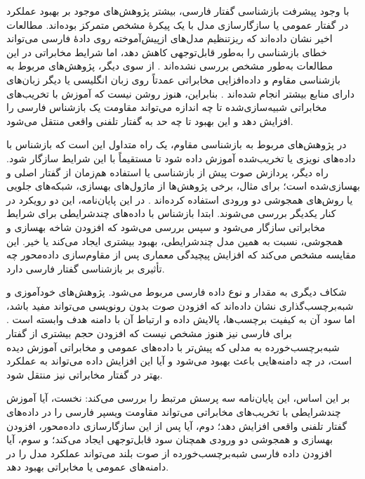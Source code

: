 با وجود پیشرفت بازشناسی گفتار فارسی، بیشتر پژوهش‌های موجود بر بهبود عملکرد در گفتار عمومی یا سازگارسازی مدل با یک پیکرهٔ مشخص متمرکز بوده‌اند. مطالعات اخیر نشان داده‌اند که ریزتنظیم مدل‌های ازپیش‌آموخته روی دادهٔ فارسی می‌تواند خطای بازشناسی را به‌طور قابل‌توجهی کاهش دهد، اما شرایط مخابراتی در این مطالعات به‌طور مشخص بررسی نشده‌اند . از سوی دیگر، پژوهش‌های مربوط به بازشناسی مقاوم و داده‌افزایی مخابراتی عمدتاً روی زبان انگلیسی یا دیگر زبان‌های دارای منابع بیشتر انجام شده‌اند . بنابراین، هنوز روشن نیست که آموزش با تخریب‌های مخابراتی شبیه‌سازی‌شده تا چه اندازه می‌تواند مقاومت یک بازشناس فارسی را افزایش دهد و این بهبود تا چه حد به گفتار تلفنی واقعی منتقل می‌شود.

در پژوهش‌های مربوط به بازشناسی مقاوم، یک راه متداول این است که بازشناس با داده‌های نویزی یا تخریب‌شده آموزش داده شود تا مستقیماً با این شرایط سازگار شود. راه دیگر، پردازش صوت پیش از بازشناسی یا استفاده هم‌زمان از گفتار اصلی و بهسازی‌شده است؛ برای مثال، برخی پژوهش‌ها از ماژول‌های بهسازی، شبکه‌های جلویی یا روش‌های همجوشی دو ورودی استفاده کرده‌اند . در این پایان‌نامه، این دو رویکرد در کنار یکدیگر بررسی می‌شوند. ابتدا بازشناس با داده‌های چندشرایطی برای شرایط مخابراتی سازگار می‌شود و سپس بررسی می‌شود که افزودن شاخه بهسازی و همجوشی، نسبت به همین مدل چندشرایطی، بهبود بیشتری ایجاد می‌کند یا خیر. این مقایسه مشخص می‌کند که افزایش پیچیدگی معماری پس از مقاوم‌سازی داده‌محور چه تأثیری بر بازشناسی گفتار فارسی دارد.

شکاف دیگری به مقدار و نوع داده فارسی مربوط می‌شود. پژوهش‌های خودآموزی و شبه‌برچسب‌گذاری نشان داده‌اند که افزودن صوت بدون رونویسی می‌تواند مفید باشد، اما سود آن به کیفیت برچسب‌ها، پالایش داده و ارتباط آن با دامنه هدف وابسته است . برای فارسی نیز هنوز مشخص نیست که افزودن حجم بیشتری از گفتار شبه‌برچسب‌خورده به مدلی که پیش‌تر با داده‌های عمومی و مخابراتی آموزش دیده است، در چه دامنه‌هایی باعث بهبود می‌شود و آیا این افزایش داده می‌تواند به عملکرد بهتر در گفتار مخابراتی نیز منتقل شود.

بر این اساس، این پایان‌نامه سه پرسش مرتبط را بررسی می‌کند: نخست، آیا آموزش چندشرایطی با تخریب‌های مخابراتی می‌تواند مقاومت ویسپر فارسی را در داده‌های گفتار تلفنی واقعی افزایش دهد؛ دوم، آیا پس از این سازگارسازی داده‌محور، افزودن بهسازی و همجوشی دو ورودی همچنان سود قابل‌توجهی ایجاد می‌کند؛ و سوم، آیا افزودن داده فارسی شبه‌برچسب‌خورده از صوت بلند می‌تواند عملکرد مدل را در دامنه‌های عمومی یا مخابراتی بهبود دهد.

